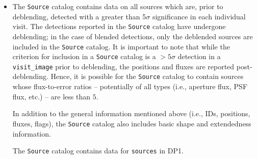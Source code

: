 \begin{itemize}
\item The \texttt{Source} catalog \citep{10.71929/rubin/2570323} contains data on all sources which are, prior to deblending, detected with a greater than 5$\sigma$ significance in each individual visit.
The detections reported in the \texttt{Source} catalog have undergone deblending; in the case of blended detections, only the deblended sources are included in the \texttt{Source} catalog.
It is important to note that while the criterion for inclusion in a \texttt{Source} catalog is a $>5\sigma$ detection in a \texttt{visit\_image} prior to deblending, the positions and fluxes are reported post-deblending. 
Hence, it is possible for the \texttt{Source} catalog to contain sources whose \gls{flux}-to-error ratios -- potentially of all types (i.e., aperture \gls{flux}, \gls{PSF} \gls{flux}, etc.) -- are less than $5$.

In addition to the general information mentioned above (i.e., IDs, positions, fluxes, flags), the \texttt{Source} catalog also includes basic \gls{shape} and extendedness information.

The \texttt{Source} catalog contains data for \nsources \texttt{sources} in \gls{DP1}.



\end{itemize}
